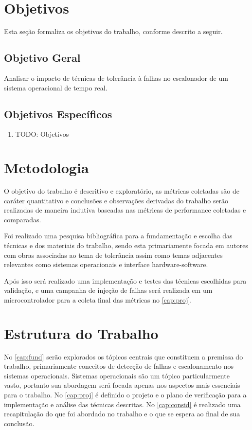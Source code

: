 \section{Objetivos}

Esta seção formaliza os objetivos do trabalho, conforme descrito a seguir.

\bigskip
\subsection{Objetivo Geral}

Analisar o impacto de técnicas de tolerância à falhas no escalonador de um sistema operacional de tempo real.

\bigskip
\subsection{Objetivos Específicos}

\begin{enumerate}
    \item TODO: Objetivos
\end{enumerate}

\section{Metodologia}

O objetivo do trabalho é descritivo e exploratório, as métricas coletadas são de caráter quantitativo e conclusões e observações derivadas do trabalho serão realizadas de maneira indutiva baseadas nas métricas de performance coletadas e comparadas.

Foi realizado uma pesquisa bibliográfica para a fundamentação e escolha das técnicas e dos materiais do trabalho, sendo esta primariamente focada em autores com obras associadas ao tema de tolerância assim como temas adjacentes relevantes como sistemas operacionais e interface hardware-software.

Após isso será realizado uma implementação e testes das técnicas escolhidas para validação, e uma campanha de injeção de falhas será realizada em um microcontrolador para a coleta final das métricas no \autoref{cap:proj}.

\section{Estrutura do Trabalho}

No \autoref{cap:fund} serão explorados os tópicos centrais que constituem a premissa do trabalho, primariamente conceitos de detecção de falhas e escalonamento nos sistemas operacionais. Sistemas operacionais são um tópico particularmente vasto, portanto sua abordagem será focada apenas nos aspectos mais essenciais para o trabalho. No \autoref{cap:proj} é definido o projeto e o plano de verificação para a implementação e análise das técnicas descritas. No \autoref{cap:consid} é realizado uma recapitulação do que foi abordado no trabalho e o que se espera ao final de sua conclusão.


